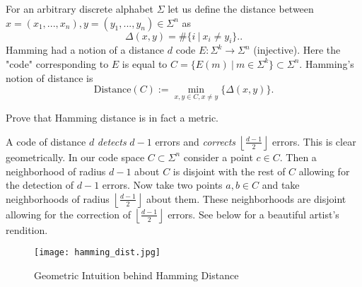 \documentclass[10pt]{article}
\begin{document}
For an arbitrary discrete alphabet $\Sigma$ let us define the distance between $x = (x_1, ..., x_n), y = (y_1, ..., y_n) \in \Sigma^n$ as 
$$
\Delta(x, y) = \#\{i \ | \ x_i \neq y_i\}.
.$$
Hamming had a notion of a distance $d$ code $E: \Sigma^k \rightarrow \Sigma^n$ (injective). Here the "code" corresponding to $E$ is equal to $C = \{E(m) \ | \ m \in \Sigma^k\} \subset \Sigma^n.$ Hamming's notion of distance is
$$
\text{Distance}(C) := \min_{x, y \in C, x \neq y} \{\Delta(x, y)\}
.$$
\begin{exercise}
Prove that Hamming distance is in fact a metric.
\end{exercise}
A code of distance $d$ \emph{detects} $d-1$ errors and \emph{corrects} $\left\lfloor\frac{d-1}{2}\right\rfloor$ errors. This is clear geometrically. In our code space $C \subset \Sigma^n$ consider a point $c \in C.$ Then a neighborhood of radius $d-1$ about $C$ is disjoint with the rest of $C$ allowing for the detection of $d-1$ errors. Now take two points $a, b \in C$ and take neighborhoods of radius $\left\lfloor\frac{d-1}{2}\right\rfloor$ about them. These neighborhoods are disjoint allowing for the correction of $\left\lfloor\frac{d-1}{2}\right\rfloor$ errors. See below for a beautiful artist's rendition.\newline
\begin{figure}
\texttt{[image: hamming\_dist.jpg]}
\caption{Geometric Intuition behind Hamming Distance}
\end{figure}
\end{document}
